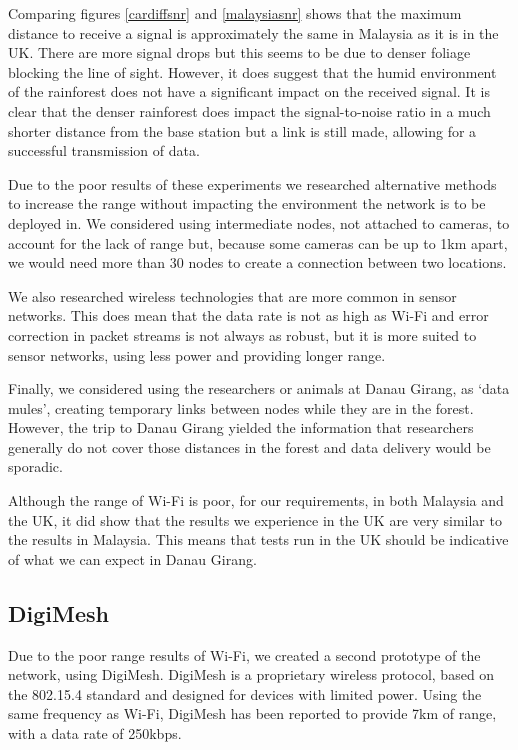 			Comparing figures \ref{cardiffsnr} and \ref{malaysiasnr} shows that the maximum distance to receive a signal is approximately the same in Malaysia as it is in the UK.  There are more signal drops but this seems to be due to denser foliage blocking the line of sight. However, it does suggest that the humid environment of the rainforest does not have a significant impact on the received signal. It is clear that the denser rainforest does impact the signal-to-noise ratio in a much shorter distance from the base station but a link is still made, allowing for a successful transmission of data.
			
Due to the poor results of these experiments we researched alternative methods to increase the range without impacting the environment the network is to be deployed in. We considered using intermediate nodes, not attached to cameras, to account for the lack of range but, because some cameras can be up to 1km apart, we would need more than 30 nodes to create a connection between two locations.
			
We also researched wireless technologies that are more common in sensor networks. This does mean that the data rate is not as high as Wi-Fi and error correction in packet streams is not always as robust, but it is more suited to sensor networks, using less power and providing longer range.
			
Finally, we considered using the researchers or animals at Danau Girang, as `data mules', creating temporary links between nodes while they are in the forest. However, the trip to Danau Girang yielded the information that researchers generally do not cover those distances in the forest and data delivery would be sporadic.
			
Although the range of Wi-Fi is poor, for our requirements, in both Malaysia and the UK, it did show that the results we experience in the UK are very similar to the results in Malaysia. This means that tests run in the UK should be indicative of what we can expect in Danau Girang.

\subsection{DigiMesh}\label{tech:digimesh}
		Due to the poor range results of Wi-Fi, we created a second prototype of the network, using DigiMesh. DigiMesh is a proprietary wireless protocol, based on the 802.15.4 standard and designed for devices with limited power. Using the same frequency as Wi-Fi, DigiMesh has been reported to provide 7km of range, with a data rate of 250kbps.
		
